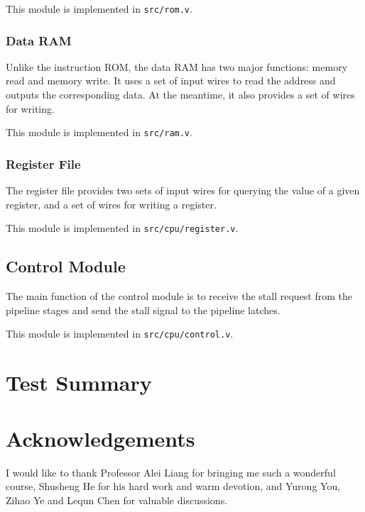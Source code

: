 \documentclass{article}
\begin{document}
This module is implemented in \texttt{src/rom.v}.

\subsubsection{Data RAM}
Unlike the instruction ROM, the data RAM has two major functions: memory read and memory write. It uses a set of input wires to read the address and outputs the corresponding data. At the meantime, it also provides a set of wires for writing.

This module is implemented in \texttt{src/ram.v}.

\subsubsection{Register File}
The register file provides two sets of input wires for querying the value of a given register, and a set of wires for writing a register.

This module is implemented in \texttt{src/cpu/register.v}.

\subsection{Control Module}
The main function of the control module is to receive the stall request from the pipeline stages and send the stall signal to the pipeline latches.

This module is implemented in \texttt{src/cpu/control.v}.

%
%

\section{Test Summary}


\section{Acknowledgements}
I would like to thank Professor Alei Liang for bringing me such a wonderful course, Shusheng He for his hard work and warm devotion, and Yurong You, Zihao Ye and Lequn Chen for valuable discussions.
\end{document}
